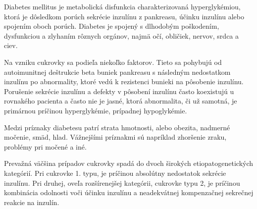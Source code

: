 Diabetes mellitus je metabolická disfunkcia charakterizovaná hyperglykémiou, ktorá je dôsledkom porúch sekrécie inzulínu z pankreasu, účinku inzulínu alebo spojením oboch porúch.\cite{2004}
Diabetes je spojený s dlhodobým poškodením, dysfunkciou a zlyhaním rôznych orgánov, najmä očí, obličiek, nervov, srdca a ciev.

Na vzniku cukrovky sa podieľa niekoľko faktorov. Tieto sa pohybujú od autoimunitnej deštrukcie beta buniek pankreasu s následným nedostatkom inzulínu po abnormality, ktoré vedú k rezistenci bunieki na pôsobenie inzulínu.
Porušenie sekrécie inzulínu a defekty v pôsobení inzulínu často koexistujú u rovnakého pacienta a často nie je jasné, ktorá abnormalita, či už samotná, je primárnou príčinou hyperglykémie, prípadnej hypoglykémie.\cite{2004}

Medzi príznaky diabetesu patrí strata hmotnosti, alebo obezita, nadmerné močenie, smäd, hlad. Vážnejšími príznakmi sú napríklad zhoršenie zraku, problémy pri močené a iné.\cite{2004}

Prevažná väčšina prípadov cukrovky spadá do dvoch širokých etiopatogenetických kategórií. Pri cukrovke 1. typu, je príčinou absolútny nedostatok sekrécie inzulínu. Pri druhej, oveľa rozšírenejšej kategórii, cukrovke typu 2, je príčinou kombinácia odolnosti voči účinku inzulínu a neadekvátnej kompenzačnej sekrečnej reakcie na inzulín.\cite{2004}


